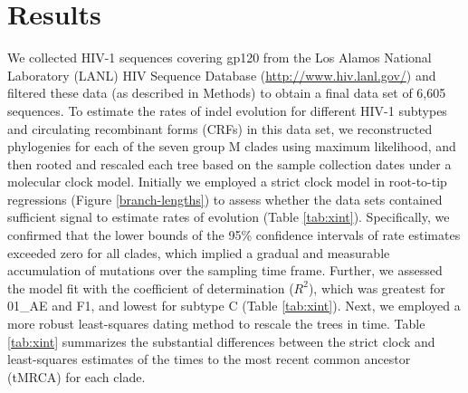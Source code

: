 \documentclass[12pt]{article}
\begin{document}

\section * {Results}

We collected HIV-1 sequences covering gp120 from the Los Alamos National Laboratory (LANL) HIV Sequence Database (\url{http://www.hiv.lanl.gov/}) and filtered these data (as described in Methods) to obtain a final data set of 6,605 sequences. 
To estimate the rates of indel evolution for different HIV-1 subtypes and circulating recombinant forms (CRFs) in this data set, we reconstructed phylogenies for each of the seven group M clades using maximum likelihood, and then rooted and rescaled each tree based on the sample collection dates under a molecular clock model.
Initially we employed a strict clock model in root-to-tip regressions (Figure \ref{branch-lengths}) to assess whether the data sets contained sufficient signal to estimate rates of evolution (Table \ref{tab:xint}).
Specifically, we confirmed that the lower bounds of the 95\% confidence intervals of rate estimates exceeded zero for all clades, which implied a gradual and measurable accumulation of mutations over the sampling time frame.
Further, we assessed the model fit with the coefficient of determination ($R^2$), which was greatest for 01\_AE and F1, and lowest for subtype C (Table \ref{tab:xint}).
Next, we employed a more robust least-squares dating method \citep{To:2015} to rescale the trees in time.  
Table \ref{tab:xint} summarizes the substantial differences between the strict clock and least-squares estimates of the times to the most recent common ancestor (tMRCA) for each clade.
\end{document}
